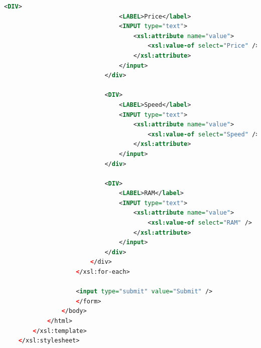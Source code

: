 \documentclass[12pt]{article}
\begin{document}
\begin{enumerate}[1.]
\begin{enumerate}[a)]
\begin{lstlisting}[language=XML]
                            <DIV>
                                <LABEL>Price</label>
                                <INPUT type="text">
                                    <xsl:attribute name="value">
                                        <xsl:value-of select="Price" />
                                    </xsl:attribute>
                                </input>
                            </div>

                            <DIV>
                                <LABEL>Speed</label>
                                <INPUT type="text">
                                    <xsl:attribute name="value">
                                        <xsl:value-of select="Speed" />
                                    </xsl:attribute>
                                </input>
                            </div>

                            <DIV>
                                <LABEL>RAM</label>
                                <INPUT type="text">
                                    <xsl:attribute name="value">
                                        <xsl:value-of select="RAM" />
                                    </xsl:attribute>
                                </input>
                            </div>
                        </div>
                    </xsl:for-each>

                    <input type="submit" value="Submit" />
                    </form>
                </body>
            </html>
        </xsl:template>
    </xsl:stylesheet>
    \end{lstlisting}



    \end{enumerate}
\end{enumerate}
\end{document}
